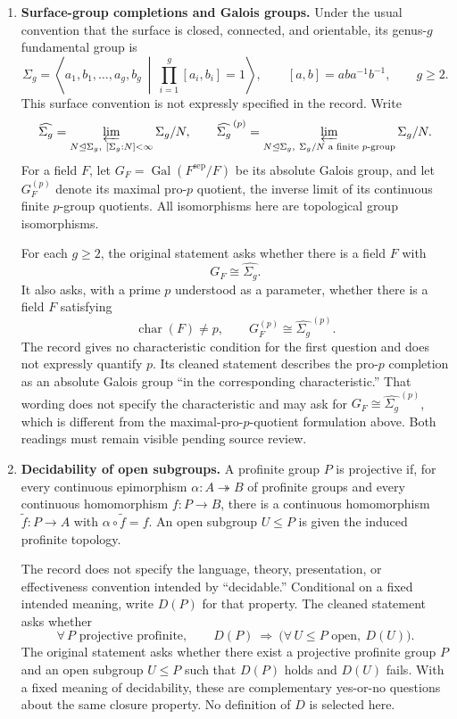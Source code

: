 \documentclass[11pt]{article}
\begin{document}
\begin{enumerate}
\item \textbf{Surface-group completions and Galois groups.} Under the usual convention that the surface is closed, connected, and orientable, its genus-\(g\) fundamental group is
\[
\Sigma_g=\left\langle a_1,b_1,\ldots,a_g,b_g\ \middle|\ \prod_{i=1}^{g}[a_i,b_i]=1\right\rangle,
\qquad [a,b]=aba^{-1}b^{-1},\qquad g\geq2.
\]
This surface convention is not expressly specified in the record. Write
\[
\widehat{\Sigma_g}=\varprojlim_{N\trianglelefteq\Sigma_g,\ [\Sigma_g:N]<\infty}\Sigma_g/N,
\qquad
\widehat{\Sigma_g}^{\,(p)}=\varprojlim_{N\trianglelefteq\Sigma_g,\ \Sigma_g/N\text{ a finite }p\text{-group}}\Sigma_g/N.
\]
For a field \(F\), let \(G_F=\operatorname{Gal}(F^{\mathrm{sep}}/F)\) be its absolute Galois group, and let \(G_F^{(p)}\) denote its maximal pro-\(p\) quotient, the inverse limit of its continuous finite \(p\)-group quotients. All isomorphisms here are topological group isomorphisms.

For each \(g\geq2\), the original statement asks whether there is a field \(F\) with
\[
G_F\cong\widehat{\Sigma_g}.
\]
It also asks, with a prime \(p\) understood as a parameter, whether there is a field \(F\) satisfying
\[
\operatorname{char}(F)\ne p,
\qquad G_F^{(p)}\cong\widehat{\Sigma_g}^{\,(p)}.
\]
The record gives no characteristic condition for the first question and does not expressly quantify \(p\). Its cleaned statement describes the pro-\(p\) completion as an absolute Galois group ``in the corresponding characteristic.'' That wording does not specify the characteristic and may ask for \(G_F\cong\widehat{\Sigma_g}^{\,(p)}\), which is different from the maximal-pro-\(p\)-quotient formulation above. Both readings must remain visible pending source review.

\item \textbf{Decidability of open subgroups.} A profinite group \(P\) is projective if, for every continuous epimorphism \(\alpha:A\twoheadrightarrow B\) of profinite groups and every continuous homomorphism \(f:P\to B\), there is a continuous homomorphism \(\widetilde f:P\to A\) with \(\alpha\circ\widetilde f=f\). An open subgroup \(U\leq P\) is given the induced profinite topology.

The record does not specify the language, theory, presentation, or effectiveness convention intended by ``decidable.'' Conditional on a fixed intended meaning, write \(D(P)\) for that property. The cleaned statement asks whether
\[
\forall\,P\text{ projective profinite},\qquad
D(P)\ \Longrightarrow\
\bigl(\forall\,U\leq P\text{ open},\ D(U)\bigr).
\]
The original statement asks whether there exist a projective profinite group \(P\) and an open subgroup \(U\leq P\) such that \(D(P)\) holds and \(D(U)\) fails. With a fixed meaning of decidability, these are complementary yes-or-no questions about the same closure property. No definition of \(D\) is selected here.
\end{enumerate}
\end{document}
